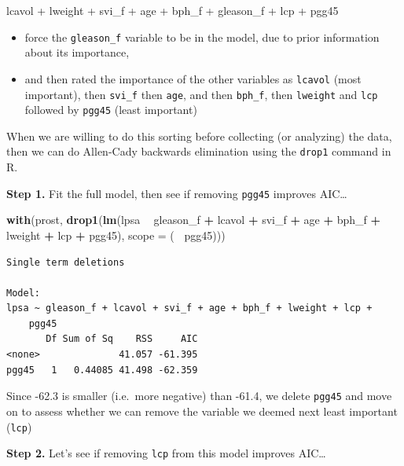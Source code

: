 \documentclass[]{book}
\newenvironment{Shaded}{\begin{snugshade}}{\end{snugshade}}
\newcommand{\KeywordTok}[1]{\textcolor[rgb]{0.13,0.29,0.53}{\textbf{#1}}}
\newcommand{\DataTypeTok}[1]{\textcolor[rgb]{0.13,0.29,0.53}{#1}}
\newcommand{\StringTok}[1]{\textcolor[rgb]{0.31,0.60,0.02}{#1}}
\newcommand{\OperatorTok}[1]{\textcolor[rgb]{0.81,0.36,0.00}{\textbf{#1}}}
\newcommand{\NormalTok}[1]{#1}
\providecommand{\tightlist}{%
  \setlength{\itemsep}{0pt}\setlength{\parskip}{0pt}}
\theoremstyle{definition}
\theoremstyle{definition}
\theoremstyle{definition}
\theoremstyle{remark}
\begin{document}
lcavol + lweight + svi\_f + age + bph\_f + gleason\_f + lcp + pgg45

\begin{itemize}
\tightlist
\item
  force the \texttt{gleason\_f} variable to be in the model, due to
  prior information about its importance,
\item
  and then rated the importance of the other variables as
  \texttt{lcavol} (most important), then \texttt{svi\_f} then
  \texttt{age}, and then \texttt{bph\_f}, then \texttt{lweight} and
  \texttt{lcp} followed by \texttt{pgg45} (least important)
\end{itemize}

When we are willing to do this sorting before collecting (or analyzing)
the data, then we can do Allen-Cady backwards elimination using the
\texttt{drop1} command in R.

\textbf{Step 1.} Fit the full model, then see if removing \texttt{pgg45}
improves AIC\ldots{}

\begin{Shaded}
\begin{Highlighting}[]
\KeywordTok{with}\NormalTok{(prost, }\KeywordTok{drop1}\NormalTok{(}\KeywordTok{lm}\NormalTok{(lpsa }\OperatorTok{~}\StringTok{ }\NormalTok{gleason_f }\OperatorTok{+}\StringTok{ }\NormalTok{lcavol }\OperatorTok{+}\StringTok{ }\NormalTok{svi_f }\OperatorTok{+}\StringTok{ }
\StringTok{              }\NormalTok{age }\OperatorTok{+}\StringTok{ }\NormalTok{bph_f }\OperatorTok{+}\StringTok{ }\NormalTok{lweight }\OperatorTok{+}\StringTok{ }\NormalTok{lcp }\OperatorTok{+}\StringTok{ }\NormalTok{pgg45),}
              \DataTypeTok{scope =}\NormalTok{ (}\OperatorTok{~}\StringTok{ }\NormalTok{pgg45)))}
\end{Highlighting}
\end{Shaded}

\begin{verbatim}
Single term deletions

Model:
lpsa ~ gleason_f + lcavol + svi_f + age + bph_f + lweight + lcp + 
    pgg45
       Df Sum of Sq    RSS     AIC
<none>              41.057 -61.395
pgg45   1   0.44085 41.498 -62.359
\end{verbatim}

Since -62.3 is smaller (i.e.~more negative) than -61.4, we delete
\texttt{pgg45} and move on to assess whether we can remove the variable
we deemed next least important (\texttt{lcp})

\textbf{Step 2.} Let's see if removing \texttt{lcp} from this model
improves AIC\ldots{}
\end{document}
